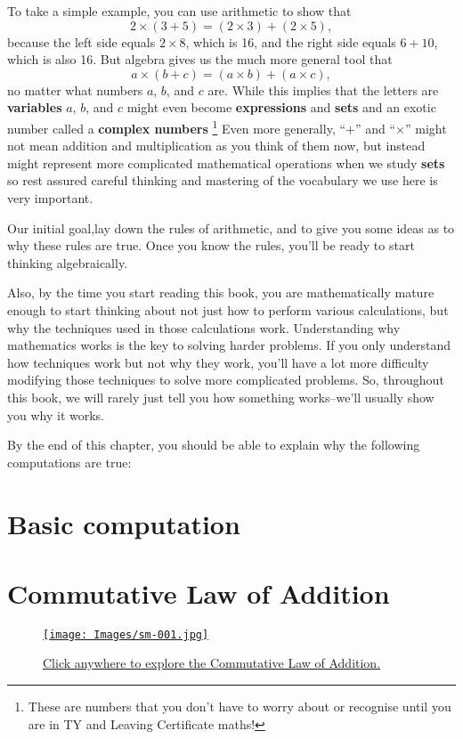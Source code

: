 To take a simple example, you can use arithmetic to show that\[ 2 \times (3 + 5) = (2 \times 3) + (2 \times 5), \]because the left side equals $2 \times 8$, which is 16, and the right side equals $6 + 10$, which is also 16. But algebra gives us the much more general tool that\[ a \times (b + c) = (a \times b) + (a \times c), \]no matter what numbers $a$, $b$, and $c$ are. While this implies that the letters are \textbf{variables} $a$, $b$, and $c$ might even become \textbf{expressions} and    \textbf{sets} and an exotic number called a \textbf{complex numbers} \footnote{These are numbers that you don't have to worry about or recognise until you are in TY and Leaving Certificate maths!} Even more generally, “$+$” and “$\times$” might not mean addition and multiplication as you think of them now, but instead might represent more complicated mathematical operations when we study \textbf{sets}  so rest assured careful thinking and mastering of the vocabulary we use here is very important.

Our initial goal,lay down the rules of arithmetic, and to give you some ideas as to why these rules are true. Once you know the rules, you’ll be ready to start thinking algebraically.

Also, by the time you start reading this book, you are mathematically mature enough to start thinking about not just how to perform various calculations, but why the techniques used in those calculations work. Understanding why mathematics works is the key to solving harder problems. If you only understand how techniques work but not why they work, you’ll have a lot more difficulty modifying those techniques to solve more complicated problems. So, throughout this book, we will rarely just tell you how something works–we’ll usually show you why it works.

By the end of this chapter, you should be able to explain why the following computations are true:

\section{Basic computation}




\section{Commutative Law of Addition}


\begin{figure*}[h!]
   \centering
    \href{https://www.geogebra.org/m/CsDdkudm}{\texttt{[image: Images/sm-001.jpg]}}
    \caption{\href{https://www.geogebra.org/m/CsDdkudm}{Click anywhere to explore the Commutative Law of Addition.}}
\end{figure*}














